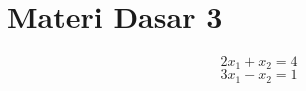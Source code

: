 \section{Materi Dasar 3}
		\paragraph*{} \lipsum[7]\cite{zz3}
		$$2x_1 + x_2  = 4$$
		$$3x_1 - x_2  = 1$$ 
		\paragraph*{} \lipsum[8]\cite{zz1,zz3}